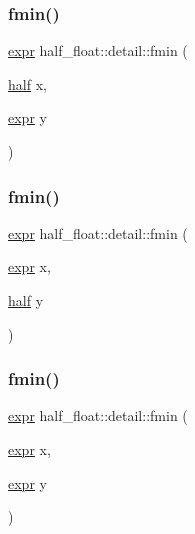 \subsubsection{\texorpdfstring{fmin()}{fmin()}\hspace{0.1cm}{\footnotesize\ttfamily [2/4]}}
{\footnotesize\ttfamily \hyperlink{structhalf__float_1_1detail_1_1expr}{expr} half\+\_\+float\+::detail\+::fmin (\begin{DoxyParamCaption}\item[{\hyperlink{classhalf__float_1_1half}{half}}]{x,  }\item[{\hyperlink{structhalf__float_1_1detail_1_1expr}{expr}}]{y }\end{DoxyParamCaption})\hspace{0.3cm}{\ttfamily [inline]}}

\mbox{\label{namespacehalf__float_1_1detail_a55ef2a52b5f71daa27a14aebc27ff772}} 
\subsubsection{\texorpdfstring{fmin()}{fmin()}\hspace{0.1cm}{\footnotesize\ttfamily [3/4]}}
{\footnotesize\ttfamily \hyperlink{structhalf__float_1_1detail_1_1expr}{expr} half\+\_\+float\+::detail\+::fmin (\begin{DoxyParamCaption}\item[{\hyperlink{structhalf__float_1_1detail_1_1expr}{expr}}]{x,  }\item[{\hyperlink{classhalf__float_1_1half}{half}}]{y }\end{DoxyParamCaption})\hspace{0.3cm}{\ttfamily [inline]}}

\mbox{\label{namespacehalf__float_1_1detail_ada351aa3dc001fcb1c210e790cccdd64}} 
\subsubsection{\texorpdfstring{fmin()}{fmin()}\hspace{0.1cm}{\footnotesize\ttfamily [4/4]}}
{\footnotesize\ttfamily \hyperlink{structhalf__float_1_1detail_1_1expr}{expr} half\+\_\+float\+::detail\+::fmin (\begin{DoxyParamCaption}\item[{\hyperlink{structhalf__float_1_1detail_1_1expr}{expr}}]{x,  }\item[{\hyperlink{structhalf__float_1_1detail_1_1expr}{expr}}]{y }\end{DoxyParamCaption})\hspace{0.3cm}{\ttfamily [inline]}}

